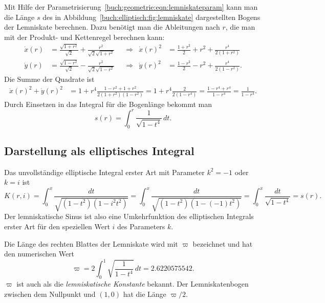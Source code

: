 Mit Hilfe der Parametrisierung~\eqref{buch:geometrie:eqn:lemniskateparam}
kann man die Länge $s$ des in Abbildung~\ref{buch:elliptisch:fig:lemniskate}
dargestellten Bogens der Lemniskate berechnen.
Dazu benötigt man die Ableitungen nach $r$, die man mit der Produkt- und
Kettenregel berechnen kann:
\begin{align*}
\dot{x}(r)
&=
\frac{\!\sqrt{1+r^2}}{\!\sqrt{2}}
+
\frac{r^2}{\!\sqrt{2}\sqrt{1+r^2}}
&&\Rightarrow&
\dot{x}(r)^2
&=
\frac{1+r^2}{2} +r^2 + \frac{r^4}{2(1+r^2)}
\\
\dot{y}(r)
&=
\frac{\!\sqrt{1-r^2}}{\!\sqrt{2}}
-
\frac{r^2}{\sqrt{2}\sqrt{1-r^2}}
&&\Rightarrow&
\dot{y}(r)^2
&=
\frac{1-r^2}{2} -r^2 + \frac{r^4}{2(1-r^2)}.
\end{align*}
Die Summe der Quadrate ist
\begin{align*}
\dot{x}(r)^2 + \dot{y}(r)^2
&=
1 + r^4\frac{1-r^2+1+r^2}{2(1+r^2)(1-r^2)}
=
1+r^4\frac{2}{2(1-r^4)}
=
\frac{1-r^4+r^4}{1-r^4}
=
\frac1{1-r^4}.
\end{align*}
Durch Einsetzen in das Integral für die Bogenlänge bekommt man
\begin{equation}
s(r)
=
\int_0^r
\frac{1}{\!\sqrt{1-t^4}}\,dt.
\label{buch:elliptisch:eqn:lemniskatebogenlaenge}
\end{equation}

%
%
\subsection{Darstellung als elliptisches Integral}
Das unvollständige elliptische Integral erster Art mit Parameter
$k^2=-1$ oder $k=i$ ist
\[
K(r,i)
=
\int_0^x \frac{dt}{\!\sqrt{(1-t^2)(1-i^2 t^2)}}
=
\int_0^x \frac{dt}{\!\sqrt{(1-t^2)(1-(-1)t^2)}}
=
\int_0^x \frac{dt}{\!\sqrt{1-t^4}}
=
s(r).
\]
Der lemniskatische Sinus ist also eine Umkehrfunktion des
elliptischen Integrals erster Art für den speziellen Wert $i$ des
Parameters $k$.

Die Länge des rechten Blattes der Lemniskate wird mit $\varpi$ bezeichnet
und hat den numerischen Wert
\begin{equation}
\varpi
=
2\int_0^1\sqrt{\frac{1}{1-t^4}}\,dt
=
2.6220575542.
\label{buch:elliptisch:eqn:varpi}
\end{equation}
$\varpi$ ist auch als die {\em lemniskatische Konstante} bekannt.
%
Der Lemniskatenbogen zwischen dem Nullpunkt und $(1,0)$ hat die Länge
$\varpi/2$.

%
%
